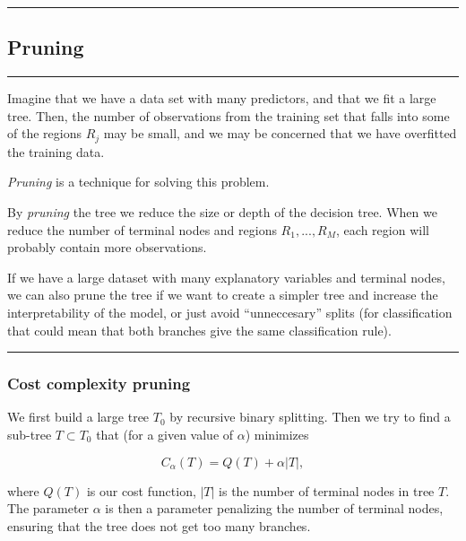 \documentclass[
  letterpaper,
  DIV=11,
  numbers=noendperiod]{scrartcl}
\begin{document}
\begin{center}\rule{0.5\linewidth}{0.5pt}\end{center}

\hypertarget{pruning}{%
\subsection{Pruning}\label{pruning}}

\begin{center}\rule{0.5\linewidth}{0.5pt}\end{center}

Imagine that we have a data set with many predictors, and that we fit a
large tree. Then, the number of observations from the training set that
falls into some of the regions \(R_j\) may be small, and we may be
concerned that we have overfitted the training data.

\emph{Pruning} is a technique for solving this problem.

By \emph{pruning} the tree we reduce the size or depth of the decision
tree. When we reduce the number of terminal nodes and regions
\(R_1,...,R_M\), each region will probably contain more observations.

If we have a large dataset with many explanatory variables and terminal
nodes, we can also prune the tree if we want to create a simpler tree
and increase the interpretability of the model, or just avoid
``unneccesary'' splits (for classification that could mean that both
branches give the same classification rule).

\begin{center}\rule{0.5\linewidth}{0.5pt}\end{center}

\hypertarget{cost-complexity-pruning}{%
\subsubsection{Cost complexity pruning}\label{cost-complexity-pruning}}

We first build a large tree \(T_0\) by recursive binary splitting. Then
we try to find a sub-tree \(T\subset T_0\) that (for a given value of
\(\alpha\)) minimizes

\[
C_{\alpha}(T)=Q(T)+\alpha |T|,
\]

where \(Q(T)\) is our cost function, \(|T|\) is the number of terminal
nodes in tree \(T\). The parameter \(\alpha\) is then a parameter
penalizing the number of terminal nodes, ensuring that the tree does not
get too many branches.
\end{document}
